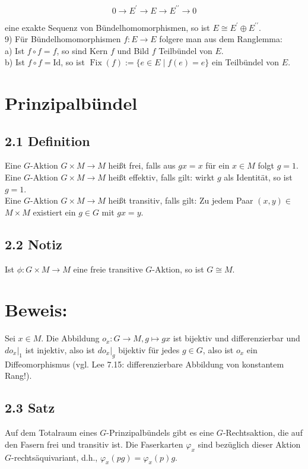 \documentclass[10pt, letterpaper]{article}
\begin{document}
$$
0 \rightarrow E^{\prime} \rightarrow E \rightarrow E^{\prime \prime} \rightarrow 0
$$

eine exakte Sequenz von Bündelhomomorphismen, so ist $E \cong E^{\prime} \oplus E^{\prime \prime}$.\\
9) Für Bündelhomomorphismen $f: E \rightarrow E$ folgere man aus dem Ranglemma:\\
a) Ist $f \circ f=f$, so sind Kern $f$ und Bild $f$ Teilbündel von $E$.\\
b) Ist $f \circ f=\mathrm{Id}$, so ist $\operatorname{Fix}(f):=\{e \in E \mid f(e)=e\}$ ein Teilbündel von $E$.



\pagebreak

\section{Prinzipalbündel}
\subsection*{2.1 Definition}
Eine $G$-Aktion $G \times M \rightarrow M$ heißt frei, falls aus $g x=x$ für ein $x \in M$ folgt $g=1$.\\
Eine $G$-Aktion $G \times M \rightarrow M$ heißt effektiv, falls gilt: wirkt $g$ als Identität, so ist $g=1$.\\
Eine $G$-Aktion $G \times M \rightarrow M$ heißt transitiv, falls gilt: Zu jedem Paar $(x, y) \in$ $M \times M$ existiert ein $g \in G$ mit $g x=y$.

\subsection*{2.2 Notiz}
Ist $\phi: G \times M \rightarrow M$ eine freie transitive $G$-Aktion, so ist $G \cong M$.

\section*{Beweis:}
Sei $x \in M$. Die Abbildung $o_{x}: G \rightarrow M, g \mapsto g x$ ist bijektiv und differenzierbar und $\left.d o_{x}\right|_{1}$ ist injektiv, also ist $\left.d o_{x}\right|_{g}$ bijektiv für jedes $g \in G$, also ist $o_{x}$ ein Diffeomorphismus (vgl. Lee 7.15: differenzierbare Abbildung von konstantem Rang!).

\subsection*{2.3 Satz}
Auf dem Totalraum eines $G$-Prinzipalbündels gibt es eine $G$-Rechtsaktion, die auf den Fasern frei und transitiv ist. Die Faserkarten $\varphi_{x}$ sind bezüglich dieser Aktion $G$-rechtsäquivariant, d.h., $\varphi_{x}(p g)=\varphi_{x}(p) g$.
\end{document}
